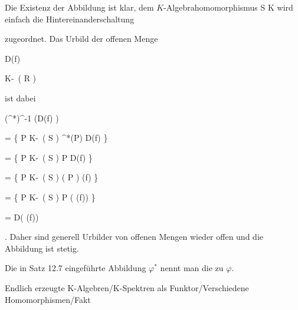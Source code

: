 {


Die Existenz der Abbildung ist klar, dem $K$-Algebrahomomorphis\-mus
 { S } { K
} {}
wird einfach die Hintereinanderschaltung


 {  }


zugeordnet. Das Urbild der offenen Menge


\mavergleichskette

{\vergleichskette

{ D(f)
}

{ \subseteq }{ K\!-\!\, \left(  R  \right)
}

{  }{
}

{    }{
}

{   }{
}

}
{}{}{}
ist dabei


\mavergleichskettealignhandlinks

{\vergleichskettealignhandlinks

{ (\varphi^*)^{-1} (D(f) )
}

{ =} { \left\{ P \in K\!-\!\, \left(  S  \right)   \mid  \varphi^*(P) \in D(f)         \right\}
}

{ =} { \left\{ P \in K\!-\!\, \left(  S  \right)   \mid   P \circ \varphi  \in D(f)         \right\}
}

{ =} { \left\{ P \in K\!-\!\, \left(  S  \right)   \mid   ( P \circ \varphi) (f)          \right\}
}

{ =} { \left\{ P \in K\!-\!\, \left(  S  \right)   \mid   P ( \varphi(f))          \right\}
}

}
{

\vergleichskettefortsetzungalign

{ =} { D( \varphi(f))
}

{ } {}

{ } {}

{ } {}

}
{}{.}
Daher sind generell Urbilder von offenen Mengen wieder offen und die Abbildung ist stetig.


}


Die in
Satz 12.7
eingeführte Abbildung $\varphi^*$ nennt man die  {} zu $\varphi$.



{Endlich erzeugte K-Algebren/K-Spektren als Funktor/Verschiedene Homomorphismen/Fakt}

